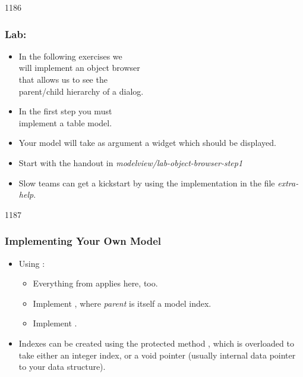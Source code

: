 \begin{slide}{1186}\frametitle{Lab: }
\begin{itemize}
\item In the following exercises we\\
  will implement an object browser\\
  that allows us to see the \\
  parent/child hierarchy of a dialog.
\item In the first step you must\\
  implement a table model. 
\item Your model will take as argument a widget which should be displayed.
\item Start with the handout in \emph{modelview/lab-object-browser-step1}
\item Slow teams can get a kickstart by using the implementation in the
  file \emph{extra-help}.
\end{itemize}
\end{slide}

\begin{slide}{1187}\frametitle{Implementing Your Own Model}\label{model_indexes_start}
\begin{itemize}
\item Using :
  \begin{itemize}
  \item Everything from  applies here, too.
  \item Implement  , where
    \emph{parent} is itself a model index.
  \item Implement  .
  \end{itemize}
\item Indexes can be created using the protected method 
  , which is overloaded to
  take either an integer index, or a void pointer (usually internal data
  pointer to your data structure).
\end{itemize}
\end{slide}

